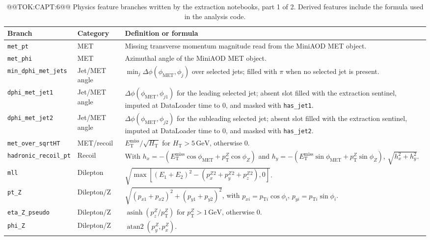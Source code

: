 \documentclass[11pt]{article}
\newcommand{\GeV}{\text{GeV}}
\newcommand{\MET}{\ensuremath{E_{\mathrm{T}}^{\mathrm{miss}}}}
\begin{document}
\begin{table}[h]
\centering
\scriptsize
\caption{@@TOK:CAPT:6@@ Physics feature branches written by the extraction notebooks, part 1 of 2. Derived features include the formula used in the analysis code.}
\label{tab:appendix-features}
\begin{tabular}{>{\raggedright\arraybackslash}p{}>{\raggedright\arraybackslash}p{}>{\raggedright\arraybackslash}p{}}
\toprule
Branch & Category & Definition or formula \\
\midrule
\texttt{met\_pt} & MET & Missing transverse momentum magnitude read from the MiniAOD MET object. \\
\texttt{met\_phi} & MET & Azimuthal angle of the MiniAOD MET object. \\
\texttt{min\_dphi\_met\_jets} & Jet/MET angle & \(\min_j \Delta\phi(\phi_{\mathrm{MET}},\phi_j)\) over selected jets; filled with \(\pi\) when no selected jet is present. \\
\texttt{dphi\_met\_jet1} & Jet/MET angle & \(\Delta\phi(\phi_{\mathrm{MET}},\phi_{j1})\) for the leading selected jet; absent slot filled with the extraction sentinel, imputed at DataLoader time to \(0\), and masked with \texttt{has\_jet1}. \\
\texttt{dphi\_met\_jet2} & Jet/MET angle & \(\Delta\phi(\phi_{\mathrm{MET}},\phi_{j2})\) for the subleading selected jet; absent slot filled with the extraction sentinel, imputed at DataLoader time to \(0\), and masked with \texttt{has\_jet2}. \\
\texttt{met\_over\_sqrtHT} & MET/recoil & \(\MET/\sqrt{H_{\mathrm{T}}}\) for \(H_{\mathrm{T}}>5\,\GeV\), otherwise 0. \\
\texttt{hadronic\_recoil\_pt} & Recoil & With \(h_x=-(\MET\cos\phi_{\mathrm{MET}}+p_{\mathrm{T}}^Z\cos\phi_Z)\) and \(h_y=-(\MET\sin\phi_{\mathrm{MET}}+p_{\mathrm{T}}^Z\sin\phi_Z)\), \(\sqrt{h_x^2+h_y^2}\). \\
\texttt{mll} & Dilepton & \(\sqrt{\max[(E_1+E_2)^2-(p_x^Z{}^2+p_y^Z{}^2+p_z^Z{}^2),0]}\). \\
\texttt{pt\_Z} & Dilepton/Z & \(\sqrt{(p_{x1}+p_{x2})^2+(p_{y1}+p_{y2})^2}\), with \(p_{xi}=p_{\mathrm{T}i}\cos\phi_i\), \(p_{yi}=p_{\mathrm{T}i}\sin\phi_i\). \\
\texttt{eta\_Z\_pseudo} & Dilepton/Z & \(\operatorname{asinh}(p_z^Z/p_{\mathrm{T}}^Z)\) for \(p_{\mathrm{T}}^Z>1\,\GeV\), otherwise 0. \\
\texttt{phi\_Z} & Dilepton/Z & \(\operatorname{atan2}(p_y^Z,p_x^Z)\). \\

\end{tabular}
\end{table}
\end{document}
